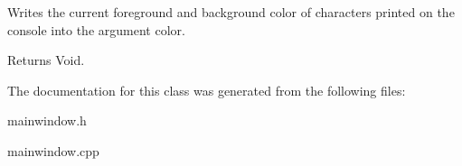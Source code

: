 Writes the current foreground and background color of characters printed on the console into the argument color. 

\begin{DoxyReturn}{Returns}
Void. 
\end{DoxyReturn}


The documentation for this class was generated from the following files\+:\begin{DoxyCompactItemize}
\item 
mainwindow.\+h\item 
mainwindow.\+cpp\end{DoxyCompactItemize}
